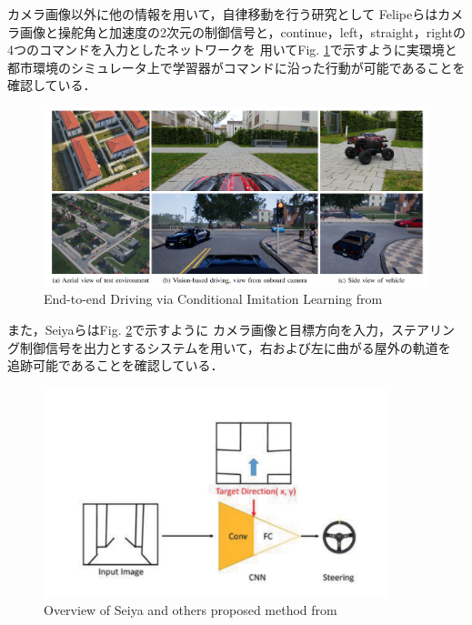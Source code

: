 カメラ画像以外に他の情報を用いて，自律移動を行う研究として
Felipeら\cite{razikon}はカメラ画像と操舵角と加速度の2次元の制御信号と，continue，left，straight，rightの4つのコマンドを入力としたネットワークを
用いてFig. \ref{fig::Conditional_Imitation_Learning}で示すように実環境と都市環境のシミュレータ上で学習器がコマンドに沿った行動が可能であることを
確認している．

\begin{figure}[H]
    \centering
    \includegraphics[width = 15cm]{./figs/End-to-end_Driving_via_Conditional_Imitation_Learning.pdf}
    \caption{End-to-end  Driving  via  Conditional  Imitation  Learning from \cite{razikon}}
    \label{fig::Conditional_Imitation_Learning}
\end{figure}

\newpage
また，Seiyaら\cite{nagoya}はFig. \ref{fig::nagoyaabst}で示すように
カメラ画像と目標方向を入力，ステアリング制御信号を出力とするシステムを用いて，右および左に曲がる屋外の軌道を
追跡可能であることを確認している．

\begin{figure}[H]
    \centering
    \includegraphics[width = 10cm]{./figs/End-to-End_Navigation_with_Branch_Turning_Support_using_Convolutional_Neural_Network_abst.pdf}
    \caption{Overview of Seiya and others proposed method from \cite{nagoya}}
    \label{fig::nagoyaabst}
\end{figure}


